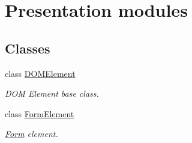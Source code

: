 \section{Presentation modules}
\label{group__OWL__UI__LAYER}
\subsection*{Classes}
\begin{DoxyCompactItemize}
\item 
class \hyperlink{classDOMElement}{DOMElement}
\begin{DoxyCompactList}\small\item\em DOM Element base class. \item\end{DoxyCompactList}\item 
class \hyperlink{classFormElement}{FormElement}
\begin{DoxyCompactList}\small\item\em \hyperlink{classForm}{Form} element. \item\end{DoxyCompactList}\end{DoxyCompactItemize}
